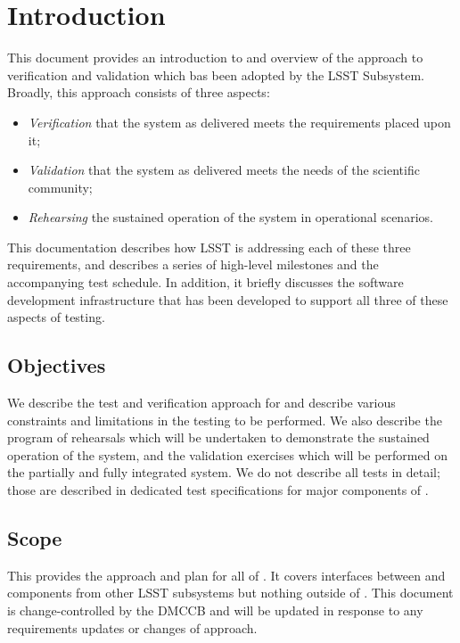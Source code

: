 \section{Introduction \label{sect:intro}}

This document provides an introduction to and overview of the approach to verification and validation which bas been adopted by the LSST \product{} Subsystem.
Broadly, this approach consists of three aspects:

\begin{itemize}

  \item{\emph{Verification} that the \product{} system as delivered meets the requirements placed upon it;}
  \item{\emph{Validation} that the system as delivered meets the needs of the scientific community;}
  \item{\emph{Rehearsing} the sustained operation of the system in operational scenarios.}

\end{itemize}

This documentation describes how LSST \product{} is addressing each of these three requirements, and describes a series of high-level milestones and the accompanying test schedule.
In addition, it briefly discusses the software development infrastructure that has been developed to support all three of these aspects of testing.

\subsection{Objectives \label{sect:objectives}}

We describe the test and verification approach for \product{} and describe various constraints and limitations in the testing to be performed.
We also describe the program of rehearsals which will be undertaken to demonstrate the sustained operation of the \product{} system, and the validation exercises which will be performed on the partially and fully integrated system.
We do not describe all tests in detail; those are described in dedicated test specifications for major components of \product{}.

\subsection{Scope \label{sect:scope}}

This provides the approach and plan for all of \product{}.
It covers interfaces between \product{} and components from other LSST subsystems but nothing outside of \product{}.
This document is change-controlled by the DMCCB and will be updated in response to any requirements updates or changes of approach.


